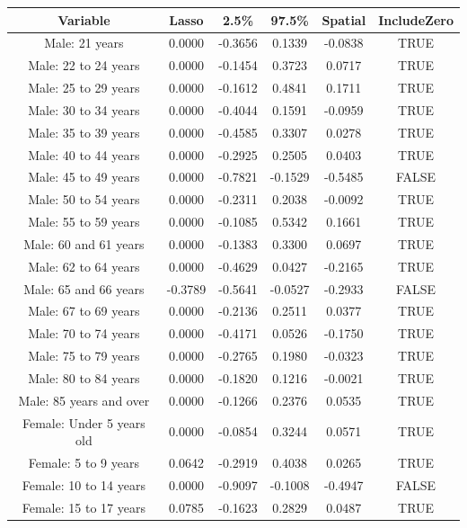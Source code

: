 \documentclass{article} %
\begin{document}
\begin{table}[H]
\centering
\begin{adjustbox}{width = 0.8\textwidth}
\begin{tabular}{cccccc}
  \hline
Variable & Lasso & 2.5\% & 97.5\% & Spatial & IncludeZero \\ 
  \hline
    Male: 21 years & 0.0000 & -0.3656 & 0.1339 & -0.0838 & TRUE \\ 
  Male: 22 to 24 years & 0.0000 & -0.1454 & 0.3723 & 0.0717 & TRUE \\ 
  Male: 25 to 29 years & 0.0000 & -0.1612 & 0.4841 & 0.1711 & TRUE \\ 
  Male: 30 to 34 years & 0.0000 & -0.4044 & 0.1591 & -0.0959 & TRUE \\ 
  Male: 35 to 39 years & 0.0000 & -0.4585 & 0.3307 & 0.0278 & TRUE \\ 
  Male: 40 to 44 years & 0.0000 & -0.2925 & 0.2505 & 0.0403 & TRUE \\ 
  Male: 45 to 49 years & 0.0000 & -0.7821 & -0.1529 & -0.5485 & FALSE \\ 
  Male: 50 to 54 years & 0.0000 & -0.2311 & 0.2038 & -0.0092 & TRUE \\ 
  Male: 55 to 59 years & 0.0000 & -0.1085 & 0.5342 & 0.1661 & TRUE \\ 
  Male: 60 and 61 years & 0.0000 & -0.1383 & 0.3300 & 0.0697 & TRUE \\ 
  Male: 62 to 64 years & 0.0000 & -0.4629 & 0.0427 & -0.2165 & TRUE \\ 
  Male: 65 and 66 years & -0.3789 & -0.5641 & -0.0527 & -0.2933 & FALSE \\ 
  Male: 67 to 69 years & 0.0000 & -0.2136 & 0.2511 & 0.0377 & TRUE \\ 
  Male: 70 to 74 years & 0.0000 & -0.4171 & 0.0526 & -0.1750 & TRUE \\ 
  Male: 75 to 79 years & 0.0000 & -0.2765 & 0.1980 & -0.0323 & TRUE \\ 
  Male: 80 to 84 years & 0.0000 & -0.1820 & 0.1216 & -0.0021 & TRUE \\ 
  Male: 85 years and over & 0.0000 & -0.1266 & 0.2376 & 0.0535 & TRUE \\ 
  Female: Under 5 years old & 0.0000 & -0.0854 & 0.3244 & 0.0571 & TRUE \\ 
  Female: 5 to 9 years & 0.0642 & -0.2919 & 0.4038 & 0.0265 & TRUE \\ 
  Female: 10 to 14 years & 0.0000 & -0.9097 & -0.1008 & -0.4947 & FALSE \\ 
  Female: 15 to 17 years & 0.0785 & -0.1623 & 0.2829 & 0.0487 & TRUE \\ 

\end{tabular}
\end{adjustbox}
\end{table}
\end{document}

